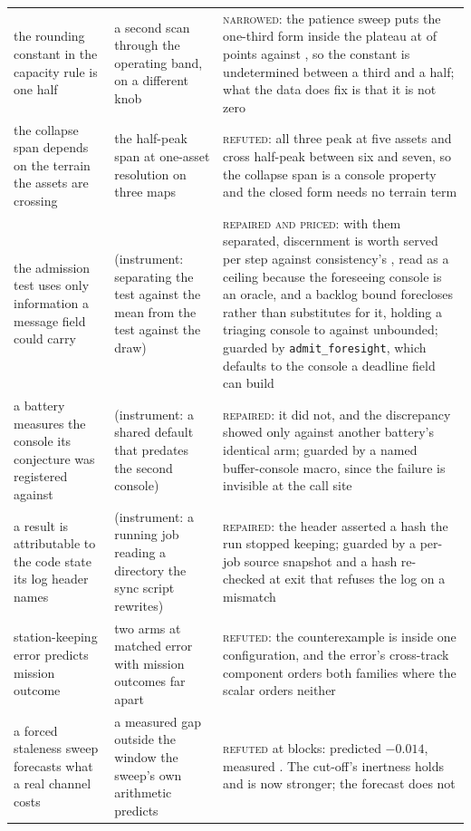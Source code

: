 \begin{tabular}{@{}p{}p{}p{}@{}}
the rounding constant in the capacity rule is one half & a second scan through the operating band, on a different knob & \textsc{narrowed}: the patience sweep puts the one-third form inside the plateau at \QcapPatThirdHit{} of \QcapPatPoints{} points against \QcapPatHalfHit{}, so the constant is undetermined between a third and a half; what the data does fix is that it is not zero \\
the collapse span depends on the terrain the assets are crossing & the half-peak span at one-asset resolution on three maps & \textsc{refuted}: all three peak at five assets and cross half-peak between six and seven, so the collapse span is a console property and the closed form needs no terrain term \\
the admission test uses only information a message field could carry & (instrument: separating the test against the mean from the test against the draw) & \textsc{repaired and priced}: with them separated, discernment is worth \FsDiscernment{} served per step against consistency's \FsConsistency{}, read as a ceiling because the foreseeing console is an oracle, and a backlog bound forecloses rather than substitutes for it, holding a triaging console to \FsBoundSeeing{} against \FsSeeing{} unbounded; guarded by \texttt{admit\_foresight}, which defaults to the console a deadline field can build \\
a battery measures the console its conjecture was registered against & (instrument: a shared default that predates the second console) & \textsc{repaired}: it did not, and the discrepancy showed only against another battery's identical arm; guarded by a named buffer-console macro, since the failure is invisible at the call site \\
a result is attributable to the code state its log header names & (instrument: a running job reading a directory the sync script rewrites) & \textsc{repaired}: the header asserted a hash the run stopped keeping; guarded by a per-job source snapshot and a hash re-checked at exit that refuses the log on a mismatch \\
station-keeping error predicts mission outcome & two arms at matched error with mission outcomes far apart & \textsc{refuted}: the counterexample is inside one configuration, and the error's cross-track component orders both families where the scalar orders neither \\
a forced staleness sweep forecasts what a real channel costs & a measured gap outside the window the sweep's own arithmetic predicts & \textsc{refuted} at \FoBrBlocks{} blocks: predicted $-0.014$, measured \FoBrGap{}. The cut-off's inertness holds and is now stronger; the forecast does not \\

\end{tabular}
